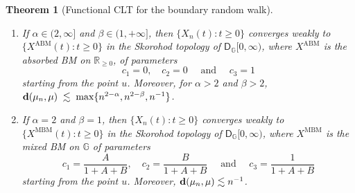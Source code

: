 \documentclass[12pt,a4paper]{article}
\theoremstyle{plain}
\newtheorem{theorem}{Theorem}[section]
\theoremstyle{remark}
\newcommand{\msf}[1]{{\mathsf #1}}
\newcommand{\bb}[1]{{\mathbb #1}}
\begin{document}
\begin{theorem}[Functional CLT for the boundary random walk]
\begin{enumerate}[leftmargin=*]
			starting from the point $u$. Moreover, 
			${\bf d}(\mu_n,\mu)\lesssim \max\{n^{\beta-1},n^{-\alpha+\beta+1 }\}\,.$
			\medskip
			\item If $\alpha\in(2,\infty]$ and $\beta \in (1,+\infty]$, then  $\{X_n(t): t\geq 0\}$ converges weakly to $\{X^\text{ABM}(t):t\geq 0\}$ in the Skorohod topology of $\msf{D}_{\bb G}[0, \infty)$, where $X^\text{ABM}$ is  the absorbed BM on $\bb{R}_{\geq 0}$, of parameters $$c_1 = 0,\quad c_2= 0\quad \text{ and } \quad c_3=1$$
			starting from the point $u$. Moreover, for $\alpha >2$ and $\beta > 2$, ${\bf d}(\mu_n,\mu) \;\lesssim\; \max\{n^{2 - \alpha}, n^{2 - \beta}, n^{-1}\}$.
			\item If $\alpha =2$ and $\beta =1$, then $\{X_n(t): t\geq 0\}$ converges weakly to  $\{X^\text{MBM}(t):t\geq 0\}$ in the Skorohod topology of $\msf{D}_\bb{G}[0,\infty)$, where $X^\text{MBM}$ is  the mixed BM on $\bb{G}$ of parameters $$c_1 = \frac{A}{1+A+B},\quad c_2 = \frac{B}{1+A+B}\quad \text{ and }\quad c_3 = \frac{1}{1+A+B}$$
			starting from the point $u$. Moreover, ${\bf d}(\mu_n,\mu)\lesssim n^{-1}$.
			
		\end{enumerate}
	\end{theorem}
	
\end{document}

